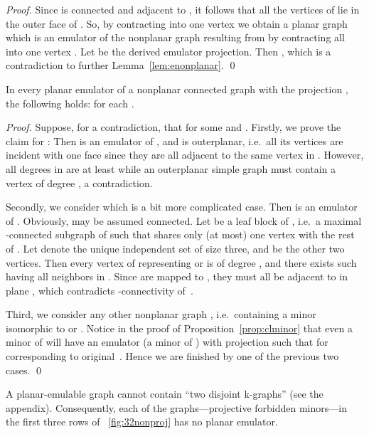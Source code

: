 \documentclass[envcountsect,envcountsame]{llncs}
\renewenvironment{accumulate}{}{}
\newenvironment{onlynoaccum}{}{}
\begin{document}
\begin{accumulate}
\begin{proof}
Since  is connected and adjacent to
, it follows that all the vertices of 
 lie in the outer face of .
So, by contracting  into one vertex  we obtain a planar
graph  which is an emulator of the nonplanar graph  resulting from
 by contracting all  into one vertex .
Let  be the derived emulator projection.
Then , which is a contradiction to further
Lemma~\ref{lem:enonplanar}.
\qed\end{proof}

\begin{lemma}
\label{lem:enonplanar}
In every planar emulator  of a nonplanar connected graph 
with the projection , the following holds:
 for each .
\end{lemma}

\begin{proof}
Suppose, for a contradiction, that  for some 
 and .
Firstly, we prove the claim for :
Then  is an emulator of , and  is outerplanar,
i.e.\ all its vertices are incident with one face since they are all adjacent to
the same vertex  in .
However, all degrees in  are at least  while an outerplanar simple graph
must contain a vertex of degree , a contradiction.

Secondly, we consider  which is a bit more complicated case.
Then  is an emulator of .
Obviously,  may be assumed connected.
Let  be a leaf block of , i.e.\ a maximal -connected subgraph of
 such that  shares only (at most) one vertex with the rest of .
Let  denote the unique independent set
of size three, and  be the other two vertices.
Then every vertex of  representing  or  is of degree ,
and there exists such  having all neighbors  in .
Since  are mapped to , they must all be adjacent to 
in plane , which contradicts -connectivity of~.

Third, we consider any other nonplanar graph , i.e.\ containing a
minor isomorphic to  or .
Notice in the proof of Proposition~\ref{prop:clminor} that even a minor  of 
 will have an emulator  (a minor of ) with projection  such that
 for  corresponding to original~.
Hence we are finished by one of the previous two cases.
\qed\end{proof}

\end{accumulate}

\begin{onlynoaccum}
\begin{theorem}
\label{thm:2kgraphs}
A planar-emulable graph cannot contain ``two disjoint k-graphs''
(see the appendix).
Consequently, each of the  graphs---projec\-tive forbidden minors---in the first three rows of \figurename~\ref{fig:32nonproj} 
has no planar emulator.
\end{theorem}
\end{onlynoaccum}
\end{document}
